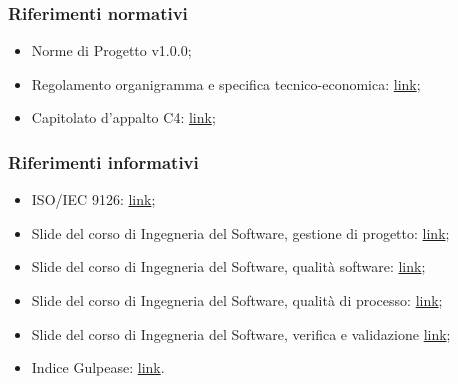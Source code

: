 \documentclass[../piano_di_qualifica.tex]{subfiles}
\begin{document}
\subsubsection{Riferimenti normativi}
\begin{itemize}
	\item Norme di Progetto v1.0.0;
	\item Regolamento organigramma e specifica tecnico-economica: \href{https://www.math.unipd.it/~tullio/IS-1/2020/Progetto/RO.html}{link};
	\item Capitolato d’appalto C4: \href{https://www.math.unipd.it/~tullio/IS-1/2020/Progetto/C4.pdf}{link};
\end{itemize}

\subsubsection{Riferimenti informativi}

\begin{itemize}
	\item ISO/IEC 9126: \href{https://en.wikipedia.org/wiki/ISO/IEC_9126}{link};
	\item Slide del corso di Ingegneria del Software, gestione di progetto: \href{https://www.math.unipd.it/~tullio/IS-1/2020/Dispense/L06.pdf}{link};
	\item Slide del corso di Ingegneria del Software, qualità software: \href{https://www.math.unipd.it/~tullio/IS-1/2020/Dispense/L12.pdf}{link};
	\item Slide del corso di Ingegneria del Software, qualità di processo: \href{https://www.math.unipd.it/~tullio/IS-1/2020/Dispense/L13.pdf}{link};
	\item Slide del corso di Ingegneria del Software, verifica e validazione \href{https://www.math.unipd.it/~tullio/IS-1/2020/Dispense/L14.pdf}{link};
	\item Indice Gulpease: \href{https://it.wikipedia.org/wiki/Indice_Gulpease}{link}.
\end{itemize}
\end{document}
